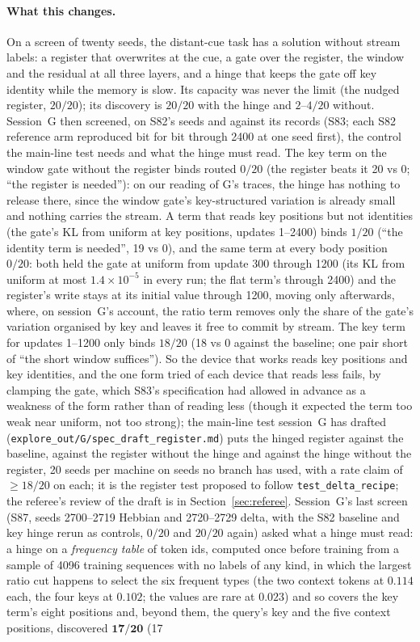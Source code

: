 \documentclass[11pt]{article}
\begin{document}
\paragraph{What this changes.} On a screen of twenty seeds, the distant-cue task has a solution without stream labels: a register that overwrites at the cue, a gate over the register, the window and the residual at all three layers, and a hinge that keeps the gate off key identity while the memory is slow. Its capacity was never the limit (the nudged register, $20/20$); its discovery is $20/20$ with the hinge and $2$--$4/20$ without. Session~G then screened, on S82's seeds and against its records (S83; each S82 reference arm reproduced bit for bit through 2400 at one seed first), the control the main-line test needs and what the hinge must read. The key term on the window gate without the register binds routed $0/20$ (the register beats it 20 vs 0; ``the register is needed''): on our reading of G's traces, the hinge has nothing to release there, since the window gate's key-structured variation is already small and nothing carries the stream. A term that reads key positions but not identities (the gate's KL from uniform at key positions, updates 1--2400) binds $1/20$ (``the identity term is needed'', 19 vs 0), and the same term at every body position $0/20$: both held the gate at uniform from update 300 through 1200 (its KL from uniform at most $1.4\times10^{-5}$ in every run; the flat term's through 2400) and the register's write stays at its initial value through 1200, moving only afterwards, where, on session~G's account, the ratio term removes only the share of the gate's variation organised by key and leaves it free to commit by stream. The key term for updates 1--1200 only binds $18/20$ (18 vs 0 against the baseline; one pair short of ``the short window suffices''). So the device that works reads key positions and key identities, and the one form tried of each device that reads less fails, by clamping the gate, which S83's specification had allowed in advance as a weakness of the form rather than of reading less (though it expected the term too weak near uniform, not too strong); the main-line test session~G has drafted (\texttt{explore\_out/G/spec\_draft\_register.md}) puts the hinged register against the baseline, against the register without the hinge and against the hinge without the register, 20 seeds per machine on seeds no branch has used, with a rate claim of $\geq 18/20$ on each; it is the register test proposed to follow \texttt{test\_delta\_recipe}; the referee's review of the draft is in Section~\ref{sec:referee}. Session~G's last screen (S87, seeds 2700--2719 Hebbian and 2720--2729 delta, with the S82 baseline and key hinge rerun as controls, $0/20$ and $20/20$ again) asked what a hinge must read: a hinge on a \emph{frequency table} of token ids, computed once before training from a sample of 4096 training sequences with no labels of any kind, in which the largest ratio cut happens to select the six frequent types (the two context tokens at $0.114$ each, the four keys at $0.102$; the values are rare at $0.023$) and so covers the key term's eight positions and, beyond them, the query's key and the five context positions, discovered $\mathbf{17/20}$ (17 
\end{document}
